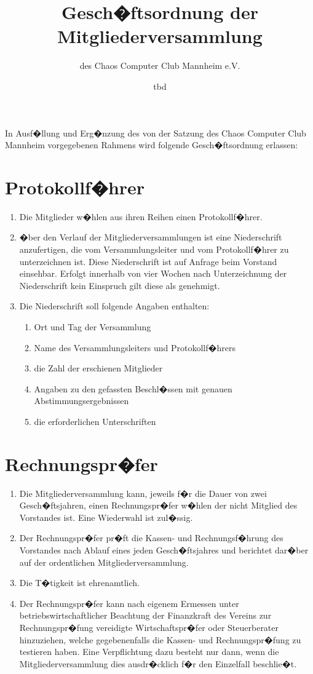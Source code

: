 \documentclass[a4paper, 12pt]{scrartcl}
\title{Gesch�ftsordnung der Mitgliederversammlung}
\subtitle{des Chaos Computer Club Mannheim e.V.}
\author{}
\date{tbd}
\begin{document}
\maketitle

In Ausf�llung und Erg�nzung des von der Satzung des Chaos Computer Club
Mannheim vorgegebenen Rahmens wird folgende Gesch�ftsordnung erlassen:

\section{Protokollf�hrer}
\begin{enumerate}
	\item Die Mitglieder w�hlen aus ihren Reihen einen Protokollf�hrer.
	\item �ber den Verlauf der Mitgliederversammlungen ist eine Niederschrift anzufertigen, die vom Versammlungsleiter und vom Protokollf�hrer zu unterzeichnen ist. Diese Niederschrift ist auf Anfrage beim Vorstand einsehbar. Erfolgt innerhalb von vier Wochen nach Unterzeichnung der Niederschrift kein Einspruch gilt diese als genehmigt.
	\item Die Niederschrift soll folgende Angaben enthalten:
		\begin{enumerate}
	  	\item Ort und Tag der Versammlung
	    \item Name des Versammlungsleiters und Protokollf�hrers
	    \item die Zahl der erschienen Mitglieder
	    \item Angaben zu den gefassten Beschl�ssen mit genauen Abstimmungsergebnissen
	    \item die erforderlichen Unterschriften
		\end{enumerate}
\end{enumerate}

\section{Rechnungspr�fer}
\begin{enumerate}
	\item Die Mitgliederversammlung kann, jeweils f�r die Dauer von zwei
Gesch�ftsjahren, einen Rechnungspr�fer w�hlen der nicht Mitglied des
Vorstandes ist. Eine Wiederwahl ist zul�ssig.
	\item Der Rechnungspr�fer pr�ft die Kassen- und Rechnungsf�hrung des
Vorstandes nach Ablauf eines jeden Gesch�ftsjahres und berichtet dar�ber
auf der ordentlichen Mitgliederversammlung.
	\item Die T�tigkeit ist ehrenamtlich.
	\item Der Rechnungspr�fer kann nach eigenem Ermessen unter
betriebswirtschaftlicher Beachtung der Finanzkraft des Vereins zur
Rechnungspr�fung vereidigte Wirtschaftspr�fer oder Steuerberater
hinzuziehen, welche gegebenenfalls die Kassen- und Rechnungspr�fung zu
testieren haben. Eine Verpflichtung dazu besteht nur dann, wenn die
Mitgliederversammlung dies ausdr�cklich f�r den Einzelfall beschlie�t.
\end{enumerate}
\end{document}
